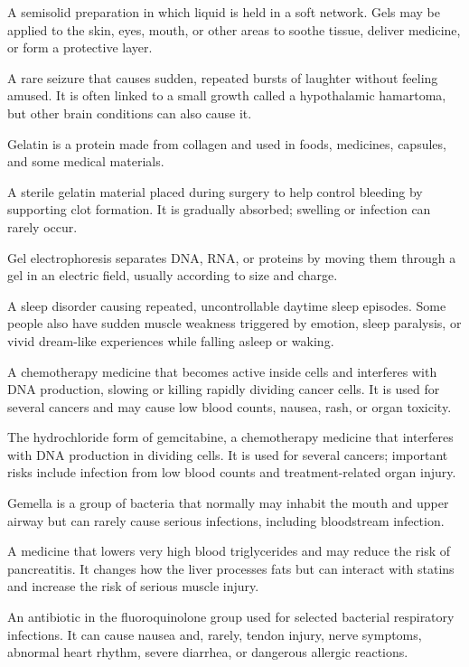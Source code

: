  A semisolid preparation in which liquid is held in a soft network. Gels may be applied to the skin, eyes, mouth, or other areas to soothe tissue, deliver medicine, or form a protective layer.

 A rare seizure that causes sudden, repeated bursts of laughter without feeling amused. It is often linked to a small growth called a hypothalamic hamartoma, but other brain conditions can also cause it.

 Gelatin is a protein made from collagen and used in foods, medicines, capsules, and some medical materials.

 A sterile gelatin material placed during surgery to help control bleeding by supporting clot formation. It is gradually absorbed; swelling or infection can rarely occur.

 Gel electrophoresis separates DNA, RNA, or proteins by moving them through a gel in an electric field, usually according to size and charge.

 A sleep disorder causing repeated, uncontrollable daytime sleep episodes. Some people also have sudden muscle weakness triggered by emotion, sleep paralysis, or vivid dream-like experiences while falling asleep or waking.

 A chemotherapy medicine that becomes active inside cells and interferes with DNA production, slowing or killing rapidly dividing cancer cells. It is used for several cancers and may cause low blood counts, nausea, rash, or organ toxicity.

 The hydrochloride form of gemcitabine, a chemotherapy medicine that interferes with DNA production in dividing cells. It is used for several cancers; important risks include infection from low blood counts and treatment-related organ injury.

 Gemella is a group of bacteria that normally may inhabit the mouth and upper airway but can rarely cause serious infections, including bloodstream infection.

 A medicine that lowers very high blood triglycerides and may reduce the risk of pancreatitis. It changes how the liver processes fats but can interact with statins and increase the risk of serious muscle injury.

 An antibiotic in the fluoroquinolone group used for selected bacterial respiratory infections. It can cause nausea and, rarely, tendon injury, nerve symptoms, abnormal heart rhythm, severe diarrhea, or dangerous allergic reactions.

